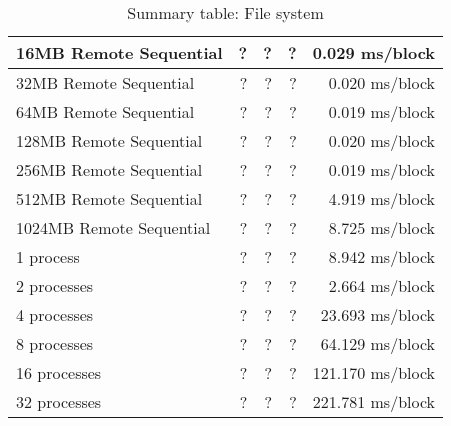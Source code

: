 \begin{table}[h]
\begin{center}
\begin{tabular}{| l | r | r | r | r |}
16MB Remote Sequential	& ?		& ?       & ?        & 0.029    ms/block \\ \hline
32MB Remote Sequential	& ?		& ?       & ?        & 0.020    ms/block \\ \hline
64MB Remote Sequential	& ?		& ?       & ?        & 0.019    ms/block \\ \hline
128MB Remote Sequential 	& ?		& ?       & ?        & 0.020    ms/block \\ \hline
256MB Remote Sequential	& ?		& ?       & ?        & 0.019    ms/block \\ \hline
512MB Remote Sequential	& ?		& ?       & ?        & 4.919    ms/block \\ \hline
1024MB Remote Sequential	& ?		& ?       & ?        & 8.725    ms/block \\ \hline\hline 





1 process		& ?		& ?       & ?        & 8.942    ms/block \\ \hline
2 processes	& ?		& ?       & ?        & 2.664    ms/block \\ \hline
4 processes	& ?		& ?       & ?        & 23.693    ms/block \\ \hline
8 processes	& ?		& ?       & ?        & 64.129    ms/block \\ \hline
16 processes	& ?		& ?       & ?        & 121.170    ms/block \\ \hline
32 processes	& ?		& ?       & ?        & 221.781    ms/block \\ \hline

\end{tabular}
\end{center}

\caption{Summary table: File system}

\end{table}

